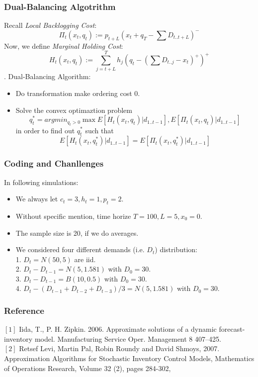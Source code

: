 \documentclass{beamer}
\begin{document}
\begin{frame}
    \frametitle{Dual-Balancing Algotrithm}
    Recall {\em Local Backlogging Cost}: 
    $$\Pi_t(x_t,q_t) := p_{t+L}(x_t + q_T - \sum D_{t..t+L})^{-}$$
    Now, we define {\em Marginal Holding Cost}:
    $$H_t(x_t,q_t) := \sum_{j = t+L}^{T} h_j (q_t - (\sum D_{t..j} - x_t)^+)^+$$.
    Dual-Balancing Algorithm:
    \begin{itemize}
      \item 
        Do transformation make ordering cost 0.
      \item
        Solve the convex optimaztion problem 
        $$q_t^* = argmin_{q_t > 0} \max{E[H_t(x_t,q_t)| d_{1..t-1}], E[\Pi_t(x_t,q_t)| d_{1..t-1}]}$$
        in order to find out $q_t^*$ such that
        $$E[H_t(x_t,q_t^*)| d_{1..t-1}] = E[\Pi_t(x_t,q_t^*)| d_{1..t-1}]$$
    \end{itemize}
\end{frame}

\begin{frame}
    \frametitle{Coding and Chanllenges}    
    
\end{frame}

\begin{frame}
In following simulations:
    \begin{itemize}
      \item We always let $c_t = 3, h_t = 1, p_t = 2$.
      \item Without specific mention, time horize $T = 100, L = 5, x_0 = 0$.
      \item The sample size is 20, if we do averages.
      \item We considered four different demands (i.e. $D_t$) distribution:\\
            1. $D_t = N(50,5)$ are iid.\\
            2. $D_t-D_{t-1} = N(5,1.581)$ with $D_0=30$.\\
            3. $D_t-D_{t-1} = B(10,0.5)$ with $D_0=30$.\\
            4. $D_t- (D_{t-1} + D_{t-2} + D_{t-3})/3 = N(5,1.581)$ with $D_0=30$.
    \end{itemize}
\end{frame}

\begin{frame}
    \frametitle{Reference}    
    $[1]$ Iida, T., P. H. Zipkin. 2006. Approximate solutions of a dynamic forecast-inventory model. Manufacturing Service Oper. Management
8 407–425.\\

    $[2]$ Retsef Levi, Martin Pal, Robin Roundy and David Shmoys, 2007. Approximation Algorithms for Stochastic Inventory Control Models, Mathematics of Operations Research, Volume 32 (2), pages 284-302, 
\end{frame}
\end{document}
